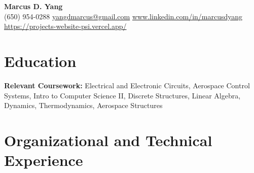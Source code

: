 \newcommand{\entrygap}{\vspace{2pt}}



\begin{center}
  {\fontsize{17}{20}\selectfont\bfseries Marcus D. Yang}\\[2pt]
  {\footnotesize (650) 954-0288 \textbar{} \href{mailto:yangdmarcus@gmail.com}{yangdmarcus@gmail.com} \textbar{} \href{https://www.linkedin.com/in/marcusdyang}{www.linkedin.com/in/marcusdyang} \textbar{} \href{https://projects-website-psi.vercel.app/}{https://projects-website-psi.vercel.app/}}
\end{center}

\section{Education}
\textbf{Relevant Coursework:} Electrical and Electronic Circuits, Aerospace Control Systems, Intro to Computer Science II, Discrete Structures, Linear Algebra, Dynamics, Thermodynamics, Aerospace Structures

\section{Organizational and Technical Experience}

